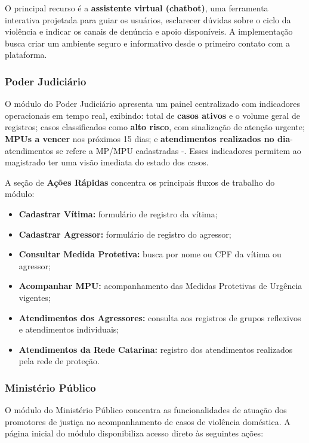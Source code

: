 \par O principal recurso é a \textbf{assistente virtual (chatbot)}, uma ferramenta interativa projetada para guiar os usuários, esclarecer dúvidas sobre o ciclo da violência e indicar os canais de denúncia e apoio disponíveis. A implementação busca criar um ambiente seguro e informativo desde o primeiro contato com a plataforma.

\subsubsection{Poder Judiciário}
\par O módulo do Poder Judiciário apresenta um painel centralizado com indicadores operacionais em tempo real, exibindo: total de \textbf{casos ativos} e o volume geral de registros; casos classificados como \textbf{alto risco}, com sinalização de atenção urgente; \textbf{MPUs a vencer} nos próximos 15 dias; e \textbf{atendimentos realizados no dia}- atendimentos se refere a MP/MPU cadastradas -. Esses indicadores permitem ao magistrado ter uma visão imediata do estado dos casos.

\par A seção de \textbf{Ações Rápidas} concentra os principais fluxos de trabalho do módulo:
\begin{itemize}
    \item \textbf{Cadastrar Vítima:} formulário de registro da vítima;
    \item \textbf{Cadastrar Agressor:} formulário de registro do agressor;
    \item \textbf{Consultar Medida Protetiva:} busca por nome ou CPF da vítima ou agressor;
    \item \textbf{Acompanhar MPU:} acompanhamento das Medidas Protetivas de Urgência vigentes;
    \item \textbf{Atendimentos dos Agressores:} consulta aos registros de grupos reflexivos e atendimentos individuais;
    \item \textbf{Atendimentos da Rede Catarina:} registro dos atendimentos realizados pela rede de proteção.
\end{itemize}

\subsubsection{Ministério Público}
\par O módulo do Ministério Público concentra as funcionalidades de atuação dos promotores de justiça no acompanhamento de casos de violência doméstica. A página inicial do módulo disponibiliza acesso direto às seguintes ações:

